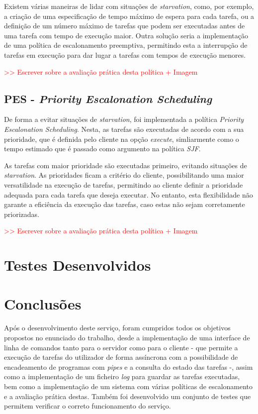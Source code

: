 \documentclass[a4paper,11pt]{scrreprt}
\begin{document}
        Existem várias maneiras de lidar com situações de \textit{starvation}, como, por exemplo,
        a criação de uma especificação de tempo máximo de espera para cada tarefa, ou a
        definição de um número máximo de tarefas que podem ser executadas antes de uma
        tarefa com tempo de execução maior. Outra solução seria a implementação de uma
        política de escalonamento preemptiva, permitindo esta a interrupção de tarefas em
        execução para dar lugar a tarefas com tempos de execução menores.

        \textcolor{red}{>> Escrever sobre a avaliação prática desta política + Imagem}
    \section{\textbf{PES} - \textit{Priority Escalonation Scheduling}}
        De forma a evitar situações de \textit{starvation}, foi implementada a política
        \textit{Priority Escalonation Scheduling}. Nesta, as tarefas são executadas
        de acordo com a sua prioridade, que é definida pelo cliente na opção \textit{execute},
        simliarmente como o tempo estimado que é passado como argumento na política \textit{SJF}.

        As tarefas com maior prioridade são executadas primeiro, evitando
        situações de \textit{starvation}. As prioridades ficam a critério do cliente,
        possibilitando uma maior versatilidade na execução de tarefas, permitindo ao cliente
        definir a prioridade adequada para cada tarefa que deseja executar. No entanto, esta
        flexibilidade não garante a eficiência da execução das tarefas, caso estas não sejam
        corretamente priorizadas.

        \textcolor{red}{>> Escrever sobre a avaliação prática desta política + Imagem}

\chapter{Testes Desenvolvidos}


\chapter{Conclusões}
    Após o desenvolvimento deste serviço, foram cumpridos todos
    os objetivos propostos no enunciado do trabalho, desde a implementação de
    uma interface de linha de comandos tanto para o servidor como para o cliente -
    que permite a execução de tarefas do utilizador de forma assíncrona com a
    possibilidade de encadeamento de programas com \textit{pipes} e a
    consulta do estado das tarefas -, assim como a implementação de um ficheiro
    \textit{log} para guardar as tarefas executadas, bem como a implementação de um
    sistema com várias políticas de escalonamento e a avaliação prática destas.
    Também foi desenvolvido um conjunto de testes que permitem verificar o correto
    funcionamento do serviço.
\end{document}
